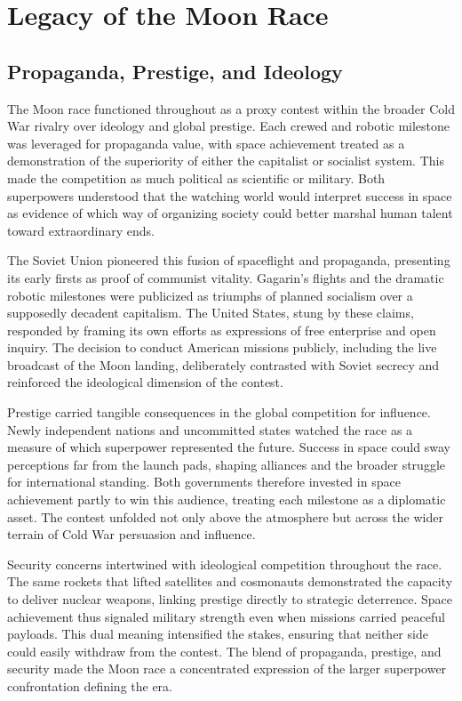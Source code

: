 \section{Legacy of the Moon Race}

\subsection{Propaganda, Prestige, and Ideology}
The Moon race functioned throughout as a proxy contest within the broader Cold War rivalry over ideology and global prestige. Each crewed and robotic milestone was leveraged for propaganda value, with space achievement treated as a demonstration of the superiority of either the capitalist or socialist system. This made the competition as much political as scientific or military. Both superpowers understood that the watching world would interpret success in space as evidence of which way of organizing society could better marshal human talent toward extraordinary ends.

The Soviet Union pioneered this fusion of spaceflight and propaganda, presenting its early firsts as proof of communist vitality. Gagarin's flights and the dramatic robotic milestones were publicized as triumphs of planned socialism over a supposedly decadent capitalism. The United States, stung by these claims, responded by framing its own efforts as expressions of free enterprise and open inquiry. The decision to conduct American missions publicly, including the live broadcast of the Moon landing, deliberately contrasted with Soviet secrecy and reinforced the ideological dimension of the contest.

Prestige carried tangible consequences in the global competition for influence. Newly independent nations and uncommitted states watched the race as a measure of which superpower represented the future. Success in space could sway perceptions far from the launch pads, shaping alliances and the broader struggle for international standing. Both governments therefore invested in space achievement partly to win this audience, treating each milestone as a diplomatic asset. The contest unfolded not only above the atmosphere but across the wider terrain of Cold War persuasion and influence.

Security concerns intertwined with ideological competition throughout the race. The same rockets that lifted satellites and cosmonauts demonstrated the capacity to deliver nuclear weapons, linking prestige directly to strategic deterrence. Space achievement thus signaled military strength even when missions carried peaceful payloads. This dual meaning intensified the stakes, ensuring that neither side could easily withdraw from the contest. The blend of propaganda, prestige, and security made the Moon race a concentrated expression of the larger superpower confrontation defining the era.

